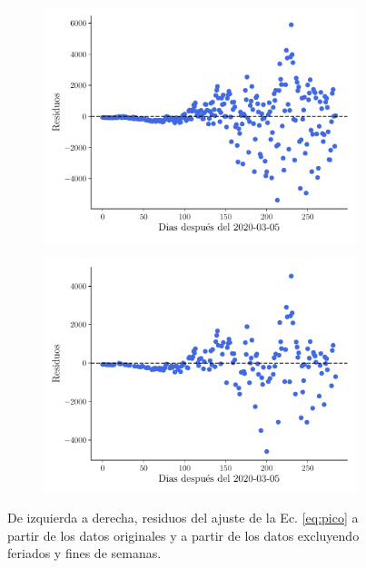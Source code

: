 \documentclass[twocolumn,aps,prl]{revtex4-1}
\begin{document}
\begin{figure}[ht!]
  \begin{subfigure}[b]{0.49\linewidth}
      \centering
      \includegraphics[width = 1.05\textwidth]{figuras/ex02-residuos.pdf}
      \caption{}
      \label{fig:ex02-residuos}
  \end{subfigure}\quad 
  \begin{subfigure}[b]{0.49\linewidth}
      \centering
      \includegraphics[width = 1.05\textwidth]{figuras/ex02-residuos-sin-Finde.pdf}
      \caption{}
      \label{fig:ex02-residuos-sin-Finde}
  \end{subfigure}
  \caption{De izquierda a derecha, residuos del ajuste de la Ec. \ref{eq:pico} a partir de los datos originales y a partir de los datos excluyendo feriados y fines de semanas.}
  \label{fig:ex02-residuos-ambas}
\end{figure}
\end{document}
